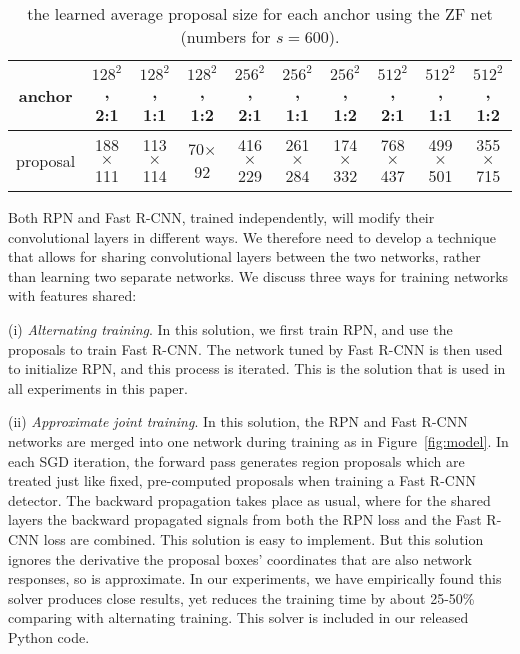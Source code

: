 \documentclass[10pt,journal,cspaper,compsoc]{IEEEtran}
\begin{document}
\setlength{\tabcolsep}{3pt}
\renewcommand{\arraystretch}{1.1}
\begin{table*}[t]
\begin{center}
\caption{the learned average proposal size for each anchor using the ZF net (numbers for $s=600$).}
\vspace{-1em}
\small
\begin{tabular}{c||c|c|c||c|c|c||c|c|c}
  anchor & $128^2$, 2:1 & $128^2$, 1:1 & $128^2$, 1:2 & $256^2$, 2:1  & $256^2$, 1:1 & $256^2$, 1:2  & $512^2$, 2:1  & $512^2$, 1:1  & $512^2$, 1:2  \\
  \hline
  proposal & 188$\times$111 & 113$\times$114 & 70$\times$92 & 416$\times$229 & 261$\times$284 & 174$\times$332 & 768$\times$437 & 499$\times$501 & 355$\times$715  \\
\end{tabular}
\label{tab:anchorsZF}
\end{center}
\end{table*}

Both RPN and Fast R-CNN, trained independently, will modify their convolutional layers in different ways.
We therefore need to develop a technique that allows for sharing convolutional layers between the two networks, rather than learning two separate networks. We discuss three ways for training networks with features shared:

(i) \emph{Alternating training}. In this solution, we first train RPN, and use the proposals to train Fast R-CNN. The network tuned by Fast R-CNN is then used to initialize RPN, and this process is iterated. This is the solution that is used in all experiments in this paper.

(ii) \emph{Approximate joint training}. In this solution, the RPN and Fast R-CNN networks are merged into one network during training as in Figure~\ref{fig:model}. In each SGD iteration, the forward pass generates region proposals which are treated just like fixed, pre-computed proposals when training a Fast R-CNN detector.
The backward propagation takes place as usual, where for the shared layers the backward propagated signals from both the RPN loss and the Fast R-CNN loss are combined. This solution is easy to implement. But this solution ignores the derivative \wrt the proposal boxes' coordinates that are also network responses, so is approximate.
In our experiments, we have empirically found this solver produces close results, yet reduces the training time by about 25-50\% comparing with alternating training. This solver is included in our released Python code.
\end{document}
